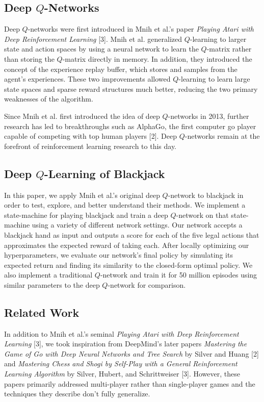 \documentclass{article}
\begin{document}
\subsection{Deep $Q$-Networks} 

Deep $Q$-networks were first introduced in Mnih et al.'s paper \textit{Playing Atari with Deep Reinforcement Learning} [3]. Mnih et al. generalized $Q$-learning to larger state and action spaces by using a neural network to learn the $Q$-matrix rather than storing the $Q$-matrix directly in memory. In addition, they introduced the concept of the experience replay buffer, which stores and samples from the agent's experiences. These two improvements allowed $Q$-learning to learn large state spaces and sparse reward structures much better, reducing the two primary weaknesses of the algorithm. 

Since Mnih et al. first introduced the idea of deep $Q$-networks in 2013, further research has led to breakthroughs such as AlphaGo, the first computer go player capable of competing with top human players [2]. Deep $Q$-networks remain at the forefront of reinforcement learning research to this day. 

\subsection{Deep $Q$-Learning of Blackjack}

In this paper, we apply Mnih et al.'s original deep $Q$-network to blackjack in order to test, explore, and better understand their methods. We implement a state-machine for playing blackjack and train a deep $Q$-network on that state-machine using a variety of different network settings. Our network accepts a blackjack hand as input and outputs a score for each of the five legal actions that approximates the expected reward of taking each. After locally optimizing our hyperparameters, we evaluate our network's final policy by simulating its expected return and finding its similarity to the closed-form optimal policy. We also implement a traditional $Q$-network and train it for 50 million episodes using similar parameters to the deep $Q$-network for comparison.  

\subsection{Related Work}

In addition to Mnih et al.'s seminal \textit{Playing Atari with Deep Reinforcement Learning} [3], we took inspiration from DeepMind's later papers \textit{Mastering the Game of Go with Deep Neural Networks and Tree Search} by Silver and Huang [2] and \textit{Mastering Chess and Shogi by Self-Play with a General Reinforcement Learning Algorithm} by Silver, Hubert, and Schrittweiser [3]. However, these papers primarily addressed multi-player rather than single-player games and the techniques they describe don't fully generalize. 
\end{document}
